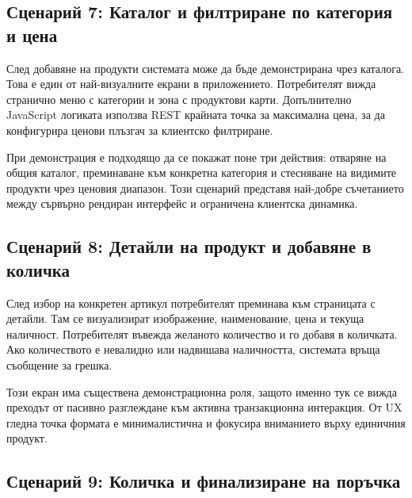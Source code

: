 
\subsection{Сценарий 7: Каталог и филтриране по категория и цена}

След добавяне на продукти системата може да бъде демонстрирана чрез каталога. Това е един от най-визуалните екрани в приложението. Потребителят вижда странично меню с категории и зона с продуктови карти. Допълнително JavaScript логиката използва REST крайната точка за максимална цена, за да конфигурира ценови плъзгач за клиентско филтриране.

При демонстрация е подходящо да се покажат поне три действия: отваряне на общия каталог, преминаване към конкретна категория и стесняване на видимите продукти чрез ценовия диапазон. Този сценарий представя най-добре съчетанието между сървърно рендиран интерфейс и ограничена клиентска динамика.


\subsection{Сценарий 8: Детайли на продукт и добавяне в количка}

След избор на конкретен артикул потребителят преминава към страницата с детайли. Там се визуализират изображение, наименование, цена и текуща наличност. Потребителят въвежда желаното количество и го добавя в количката. Ако количеството е невалидно или надвишава наличността, системата връща съобщение за грешка.

Този екран има съществена демонстрационна роля, защото именно тук се вижда преходът от пасивно разглеждане към активна транзакционна интеракция. От UX гледна точка формата е минималистична и фокусира вниманието върху единичния продукт.


\subsection{Сценарий 9: Количка и финализиране на поръчка}

